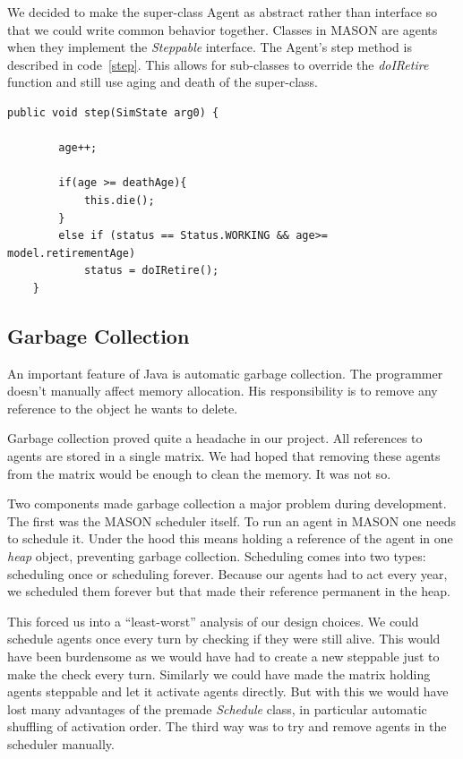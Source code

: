 \documentclass[runningheads,a4paper]{article}
\begin{document}
We decided to make the super-class Agent as abstract rather than interface so that we could write common behavior together.
Classes in MASON are agents when they implement the \textit{Steppable} interface.
The Agent's step method is described in code~\ref{step}.
This allows for sub-classes to override the \textit{doIRetire} function and still use aging and death of the super-class.
{
\linespread{1}
\begin{lstlisting}[float,caption= {Agent's step class}, label={step}]
public void step(SimState arg0) {
		
		age++;

		if(age >= deathAge){
			this.die();
		}
		else if (status == Status.WORKING && age>= model.retirementAge)	
			status = doIRetire();	
	}

\end{lstlisting}
}

\subsection{Garbage Collection}

An important feature of Java is automatic garbage collection.
The programmer doesn't manually affect memory allocation. 
His responsibility is to remove any reference to the object he wants to delete.

Garbage collection proved quite a headache in our project.
All references to agents are stored in a single matrix.
We had hoped that removing these agents from the matrix would be enough to clean the memory.
It was not so.

Two components made garbage collection a major problem during development.
The first was the MASON scheduler itself.
To run an agent in MASON one needs to schedule it.
Under the hood this means holding a reference of the agent in one \textit{heap} object, preventing garbage collection.
Scheduling comes into two types: scheduling once or scheduling forever.
Because our agents had to act every year, we scheduled them forever but that made their reference permanent in the heap.

This forced us into a ``least-worst'' analysis of our design choices.
We could schedule agents once every turn by checking if they were still alive.
This would have been burdensome as we would have had to create a new steppable just to make the check every turn.
Similarly we could have made the matrix holding agents steppable and let it activate agents directly.
But with this we would have lost many advantages of the premade \textit{Schedule} class, in particular automatic shuffling of activation order.
The third way was to try and remove agents in the scheduler manually.
\end{document}
